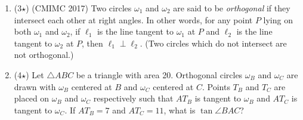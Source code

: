 \documentclass[12pt]{scrartcl}
\begin{document}
\begin{enumerate}
    \item (3$\star$) (CMIMC 2017) Two circles $\omega_1$ and $\omega_2$ are said to be \textit{orthogonal} if they intersect each other at right angles. In other words, for any point $P$ lying on both $\omega_1$ and $\omega_2$, if $\ell_1$ is the line tangent to $\omega_1$ at $P$ and $\ell_2$ is the line tangent to $\omega_2$ at $P$, then $\ell_1 \perp \ell_2$. (Two circles which do not intersect are not orthogonal.)
    
    \item (4$\star$) Let $\triangle ABC$ be a triangle with area 20. Orthogonal circles $\omega_B$ and $\omega_C$ are drawn with $\omega_B$ centered at $B$ and $\omega_C$ centered at $C$. Points $T_B$ and $T_C$ are placed on $\omega_B$ and $\omega_C$ respectively such that $AT_B$ is tangent to $\omega_B$ and $AT_C$ is tangent to $\omega_C$. If $AT_B=7$ and $AT_C=11$, what is $\tan \angle BAC$?

\end{enumerate}
\end{document}
